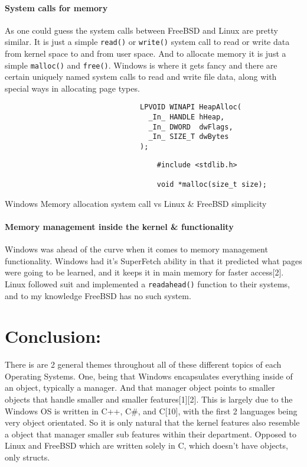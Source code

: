 \documentclass{article}
\begin{document}
\subsection{System calls for memory}
	As one could guess the system calls between FreeBSD and Linux are pretty similar. It is just a simple \texttt{read()} or \texttt{write()} system call to read or write data from kernel space to and from user space. And to allocate memory it is just a simple \texttt{malloc()} and \texttt{free()}. Windows is where it gets fancy and there are certain uniquely named system calls to read and write file data, along with special ways in allocating page types.\newline
                        		\begin{lstlisting}
                        		LPVOID WINAPI HeapAlloc(
                                  _In_ HANDLE hHeap,
                                  _In_ DWORD  dwFlags,
                                  _In_ SIZE_T dwBytes
                                );
                        		\end{lstlisting}

                        		\begin{lstlisting}
                                    #include <stdlib.h>

                                    void *malloc(size_t size);
                                \end{lstlisting}

                                Windows Memory allocation system call vs Linux \& FreeBSD simplicity
\subsection{Memory management inside the kernel \& functionality}
	Windows was ahead of the curve when it comes to memory management functionality. Windows had it’s SuperFetch ability in that it predicted what pages were going to be learned, and it keeps it in main memory for faster access[2]. Linux followed suit and implemented a \texttt{readahead()} function to their systems, and to my knowledge FreeBSD has no such system. \newpage




\part{Conclusion:}
	There is are 2 general themes throughout all of these different topics of each Operating Systems. One, being that Windows encapsulates everything inside of an object, typically a manager. And that manager object points to smaller objects that handle smaller and smaller features[1][2]. This is largely due to the Windows OS is written in C++, C\#, and C[10], with the first 2 languages being very object orientated. So it is only natural that the kernel features also resemble a object that manager smaller sub features within their department. Opposed to Linux and FreeBSD which are written solely in C, which doesn’t have objects, only structs.  \newline
\end{document}

